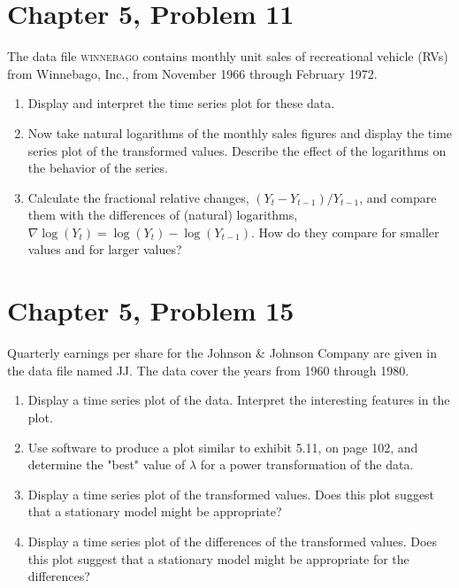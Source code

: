 \documentclass[11pt]{article}
\newif\ifclearpage
\newcommand{\problem}[1]{\section*{#1}}
\newcommand{\solution}{\hrulefill}
\newcommand{\maybeclearpage}{\ifclearpage\clearpage\fi}
\begin{document}
\solution


\maybeclearpage
\problem{Chapter 5, Problem 11}
The data file \textsc{winnebago} contains monthly unit sales of recreational vehicle (RVs) from Winnebago, Inc., from November 1966 through February 1972. 
\begin{enumerate}
\item Display and interpret the time series plot for these data.
\item Now take natural logarithms of the monthly sales figures and display the time series plot of the transformed values. Describe the effect of the logarithms on the behavior of the series.
\item Calculate the fractional relative changes, $(Y_t - Y_{t-1})/Y_{t-1}$, and compare them with the differences of (natural) logarithms, $\nabla \log(Y_t) = \log(Y_t) - \log(Y_{t-1})$. How do they compare for smaller values and for larger values?
\end{enumerate}

\solution



\maybeclearpage
\problem{Chapter 5, Problem 15}
Quarterly earnings per share for the Johnson \& Johnson Company are given in the data file named \textsc{JJ}. The data cover the years from 1960 through 1980.
\begin{enumerate}
\item Display a time series plot of the data. Interpret the interesting features in the plot.
\item Use software to produce a plot similar to exhibit 5.11, on page 102, and determine the "best" value of $\lambda$ for a power transformation of the data.
\item Display a time series plot of the transformed values. Does this plot suggest that a stationary model might be appropriate?
\item Display a time series plot of the differences of the transformed values. Does this plot suggest that a stationary model might be appropriate for the differences?
\end{enumerate}

\solution

\maybeclearpage
\end{document}
